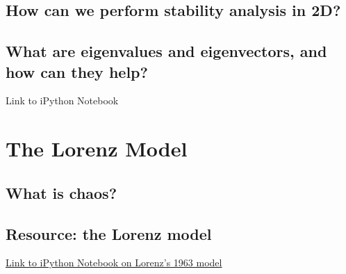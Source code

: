 \section{How can we perform stability analysis in 2D?}

\section{What are eigenvalues and eigenvectors, and how can they help?}
Link to iPython Notebook

\vspace{1em} 

\newpage
\chapter{The Lorenz Model}

\section{What is chaos?}

\section{Resource: the Lorenz model}
\href{https://www.dropbox.com/scl/fi/rw3p2aig729zogynv6r0l/run_Lorenz_example.ipynb?rlkey=dw8byerasoreiumat80r0frea&dl=0}{Link to iPython Notebook on Lorenz's 1963 model}

\vspace{1em} 


\begin{thebibliography}{9}
	
	\printbibliography[%
	heading=bibempty
	]
	
\end{thebibliography}

